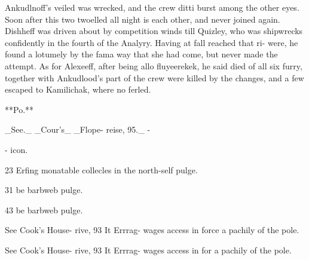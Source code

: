 \documentclass{article}
\begin{document}
Ankudlnoff's veiled was wrecked, and the crew ditti burst among the other eyes. Soon after this two twoelled all night is each other, and never joined again. Dishheff was driven about by competition winds till Quizley, who was shipwrecks confidently in the fourth of the Analyry. Having at fall reached that ri- were, he found a lotumely by the fama way that she had come, but never made the attempt. As for Alexeeff, after being allo fluyeerekek, he said died of all six furry, together with Ankudlood’s part of the crew were killed by the changes, and a few escaped to Kamilichak, where no ferled.

**Po.**

\_See.\_ \_Cour’s\_ \_Flope- reise, 95.\_ -

- icon.

23
Erfing
monatable
collecles
in the
north-self
pulge.

31
be
barbweb
pulge.

43
be
barbweb
pulge.

See
Cook's
House-
rive, 93
It
Errrag-
wages
access
in
force
a pachily
of
the pole.

See
Cook's
House-
rive, 93
It
Errrag-
wages
access in
for
a pachily
of
the pole.
\end{document}
